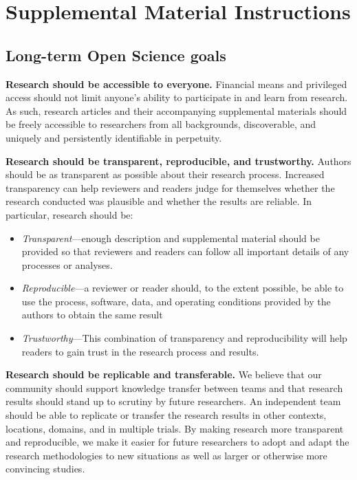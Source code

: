 \documentclass[journal]{vgtc}                %
\begin{document}
\section{Supplemental Material Instructions}
\label{sec:supplement_inst}

\subsection{Long-term Open Science goals}

\textbf{Research should be accessible to everyone.}
Financial means and privileged access should not limit anyone's ability to participate in and learn from research.
As such, research articles and their accompanying supplemental materials should be freely accessible to researchers from all backgrounds, discoverable, and uniquely and persistently identifiable in perpetuity.

\textbf{Research should be transparent, reproducible, and trustworthy.}
Authors should be as transparent as possible about their research process.
Increased transparency can help reviewers and readers judge for themselves whether the research conducted was plausible and whether the results are reliable.
In particular, research should be:
\begin{itemize}
	\item \textit{Transparent}---enough description and supplemental material should be provided so that reviewers and readers can follow all important details of any processes or analyses.
	
	\item \textit{Reproducible}---a reviewer or reader should, to the extent possible, be able to use the process, software, data, and operating conditions provided by the authors to obtain the same result
	
	\item \textit{Trustworthy}---This combination of transparency and reproducibility will help readers to gain trust in the research process and results.
\end{itemize}
	
\textbf{Research should be replicable and transferable.}
We believe that our community should support knowledge transfer between teams and that research results should stand up to scrutiny by future researchers. An independent team should be able to replicate or transfer the research results in other contexts, locations, domains, and in multiple trials. By making research more transparent and reproducible, we make it easier for future researchers to adopt and adapt the research methodologies to new situations as well as larger or otherwise more convincing studies.
\end{document}
